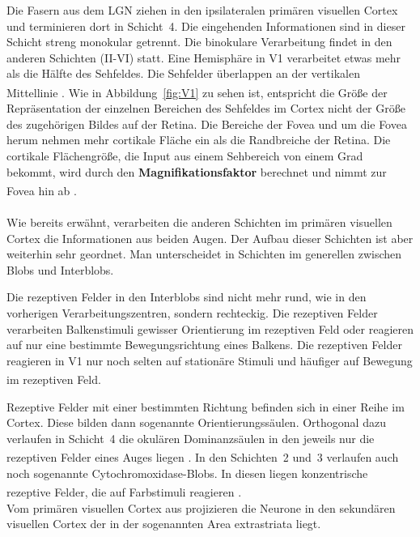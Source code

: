 Die Fasern aus dem LGN ziehen in den ipsilateralen primären visuellen Cortex und terminieren dort in Schicht~4. Die eingehenden Informationen sind in dieser Schicht streng monokular getrennt. Die binokulare Verarbeitung findet in den anderen Schichten (II-VI) statt. Eine Hemisphäre in V1 verarbeitet etwas mehr als die Hälfte des Sehfeldes. Die Sehfelder überlappen an der vertikalen Mittellinie \textsuperscript{\cite[Kap.~25]{kandel2013principles}}.
Wie in Abbildung~\ref{fig:V1} zu sehen ist, entspricht die Größe der Repräsentation der einzelnen Bereichen des Sehfeldes im Cortex nicht der Größe des zugehörigen Bildes auf der Retina. Die Bereiche der Fovea und um die Fovea herum nehmen mehr cortikale Fläche ein als die Randbreiche der Retina. Die cortikale Flächengröße, die Input aus einem Sehbereich von einem Grad bekommt, wird durch den \textbf{Magnifikationsfaktor} berechnet und nimmt zur Fovea hin ab \textsuperscript{\cite[Kap.~25]{kandel2013principles}}.
\\
\\
\noindent Wie bereits erwähnt, verarbeiten die anderen Schichten im primären visuellen Cortex die Informationen aus beiden Augen. Der Aufbau dieser Schichten ist aber weiterhin sehr geordnet. Man unterscheidet in Schichten im generellen zwischen Blobs und Interblobs.

Die rezeptiven Felder in den Interblobs sind nicht mehr rund, wie in den vorherigen Verarbeitungszentren, sondern rechteckig. Die rezeptiven Felder verarbeiten Balkenstimuli gewisser Orientierung im rezeptiven Feld oder reagieren auf nur eine bestimmte Bewegungsrichtung eines Balkens. Die rezeptiven Felder reagieren in V1 nur noch selten auf stationäre Stimuli und häufiger auf Bewegung im rezeptiven Feld. \textsuperscript{\cite[Kap.~18]{smith2008biology}}

Rezeptive Felder mit einer bestimmten Richtung befinden sich in einer Reihe im Cortex. Diese bilden dann sogenannte Orientierungssäulen. Orthogonal dazu verlaufen in Schicht~4 die okulären Dominanzsäulen in den jeweils nur die rezeptiven Felder eines Auges liegen \textsuperscript{\cite[Kap.~10]{neurowissenschaften_baer}}.
In den Schichten~2 und~3 verlaufen auch noch sogenannte Cytochromoxidase-Blobs. In diesen liegen konzentrische rezeptive Felder, die auf Farbstimuli reagieren \textsuperscript{\cite[Kap.~18]{smith2008biology}}.\\

\noindent Vom primären visuellen Cortex aus projizieren die Neurone in den sekundären visuellen Cortex der in der sogenannten Area extrastriata liegt. 


